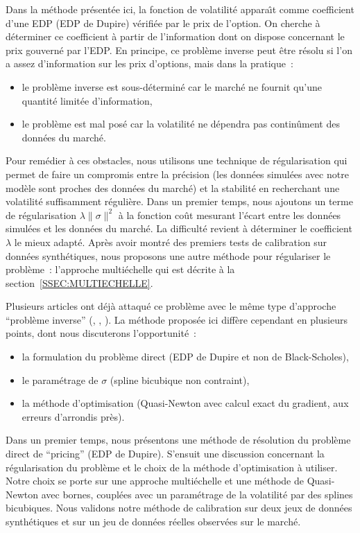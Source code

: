 Dans la m\'ethode pr\'esent\'ee ici, la fonction de volatilit\'e 
appara\^{\i}t comme coefficient d'une EDP (EDP de Dupire) 
v\'erifi\'ee par le prix de l'option. On cherche \`a d\'eterminer 
ce coefficient \`a partir de l'information dont on dispose concernant 
le prix gouvern\'e par l'EDP. En principe, ce probl\`eme inverse 
peut \^etre r\'esolu si l'on a assez d'information sur les prix 
d'options, mais dans la pratique~: 
\begin{itemize}
\item le probl\`eme inverse est sous-d\'etermin\'e car le march\'e 
ne fournit qu'une quantit\'e limit\'ee d'information,
\item le probl\`eme est mal pos\'e car la volatilit\'e ne 
d\'ependra pas contin\^ument des donn\'ees du march\'e.
\end{itemize}
Pour rem\'edier \`a ces obstacles, nous utilisons une technique de 
r\'egularisation qui permet de faire un compromis entre la 
pr\'ecision (les donn\'ees simul\'ees avec notre mod\`ele sont 
proches des donn\'ees du march\'e) et la stabilit\'e en recherchant 
une volatilit\'e suffisamment r\'eguli\`ere. Dans un premier temps, 
nous ajoutons un terme de r\'egularisation 
$\lambda \| \sigma \|^2$ \`a la fonction co\^ut mesurant l'\'ecart 
entre les donn\'ees simul\'ees et les donn\'ees du march\'e. La 
difficult\'e revient \`a d\'eterminer le coefficient $\lambda$ le 
mieux adapt\'e. Apr\`es avoir montr\'e des premiers tests de 
calibration sur donn\'ees synth\'etiques, nous proposons une 
autre m\'ethode pour r\'egulariser le probl\`eme~: l'approche 
multi\'echelle qui est d\'ecrite \`a la 
section~\ref{SSEC:MULTIECHELLE}.

Plusieurs articles ont d\'ej\`a attaqu\'e ce probl\`eme avec le 
m\^eme type d'approche ``probl\`eme inverse'' (\cite{lag:jcf:97}, 
\cite{jac:jcf:98}, \cite{col:jcf:99}). La m\'ethode propos\'ee ici 
diff\`ere cependant en plusieurs points, dont nous discuterons 
l'opportunit\'e~: 
\begin{itemize}
\item la formulation du probl\`eme direct (EDP de Dupire et non de 
Black-Scholes),
\item le param\'etrage de $\sigma$ (spline bicubique non contraint),
\item la m\'ethode d'optimisation (Quasi-Newton avec calcul exact 
du gradient, aux erreurs d'arrondis pr\`es).
\end{itemize}

Dans un premier temps, nous pr\'esentons une m\'ethode de 
r\'esolution du probl\`eme direct de ``pricing'' (EDP de Dupire). 
S'ensuit une discussion concernant la r\'egularisation du probl\`eme 
et le choix de la m\'ethode d'optimisation \`a utiliser. Notre 
choix se porte sur une approche multi\'echelle et une m\'ethode de 
Quasi-Newton avec bornes, coupl\'ees avec un param\'etrage de la 
volatilit\'e par des splines bicubiques. Nous validons notre 
m\'ethode de calibration sur deux jeux de donn\'ees synth\'etiques 
et sur un jeu de donn\'ees r\'eelles observ\'ees sur le march\'e.

